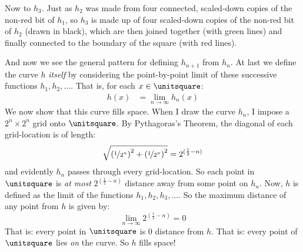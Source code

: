 \documentclass[../../../include/open-logic-section]{subfiles}
\begin{document}
Now to $h_3$. Just as $h_2$ was made from four connected, scaled-down copies of the non-red bit of $h_1$, so $h_3$ is made up of four scaled-down copies of the non-red bit of $h_2$ (drawn in black), which are then joined together (with green lines) and finally connected to the boundary of the square (with red lines).
\begin{center}
\end{center}
And now we see the general pattern for defining $h_{n+1}$ from $h_n$. At last we define the curve $h$ \emph{itself} by considering the point-by-point limit of these successive functions $h_1, h_2, \ldots$. That is, for each $x \in \unitsquare$:
\begin{align*}
	h(x) &= \lim_{n \rightarrow \infty} h_n(x)
\end{align*} 
We now show that this curve fills space. When I draw the curve $h_n$, I impose a $2^n \times 2^n$ grid onto $\unitsquare$. By Pythagoras's Theorem, the diagonal of each grid-location is of length:	$$\sqrt{\left(\nicefrac{1}{2^{n}}\right)^2+\left(\nicefrac{1}{2^{n}}\right)^2} = 2^{(\frac{1}{2}-n)}$$
and evidently $h_n$ passes through every grid-location. So each point in $\unitsquare$ is \emph{at most} $2^{(\frac{1}{2}-n)}$ distance away from some point on $h_n$. Now, $h$ is defined as the limit of the functions $h_1, h_2, h_3, \ldots$. So the maximum distance of any point from $h$ is given by:
	$$\lim_{n \rightarrow \infty} 2^{(\frac{1}{2}-n)} = 0$$
That is: every point in $\unitsquare$ is $0$ distance from $h$. That is: every point of $\unitsquare$ lies \emph{on} the curve. So $h$ fills space!
\end{document}

